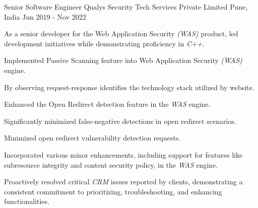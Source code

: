 \begin{cventries}
\cventry
{Senior Software Engineer} %
{Qualys Security Tech Services Private Limited} %
{Pune, India} %
{Jun 2019 - Nov 2022} %
{
\begin{cvitems}
\setlength{\itemsep}{1ex} %
%
\item {As a senior developer for the Web Application Security \textit{(WAS)} product, led development initiatives while demonstrating proficiency in \textit{C++}.}
\item {Implemented Passive Scanning feature into Web Application Security \textit{(WAS)} engine.}
    \begin{cvitemsnested}
    \item {By observing request-response identifies the technology stack utilized by website.}
    \end{cvitemsnested}
\item {Enhanced the Open Redirect detection feature in the \textit{WAS} engine.}
    \begin{cvitemsnested}
    \item {Significantly minimized false-negative detections in open redirect scenarios.}
    \item {Minimized open redirect vulnerability detection requests.}
    \end{cvitemsnested}
\item {Incorporated various minor enhancements, including support for features like subresource integrity and content security policy, in the \textit{WAS} engine.}
\item{Proactively resolved critical \textit{CRM} issues reported by clients, demonstrating a consistent commitment to prioritizing, troubleshooting, and enhancing functionalities.}
%
\end{cvitems}
}




\end{cventries}
